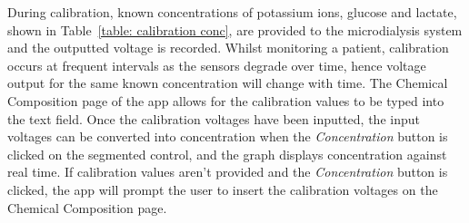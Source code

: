 During calibration, known concentrations of potassium ions, glucose and lactate, shown in Table~\ref{table: calibration conc}, are provided to the microdialysis system and the outputted voltage is recorded. Whilst monitoring a patient, calibration occurs at frequent intervals as the sensors degrade over time, hence voltage output for the same known concentration will change with time. The Chemical Composition page of the app allows for the calibration values to be typed into the text field. Once the calibration voltages have been inputted, the input voltages can be converted into concentration when the \textit{Concentration} button is clicked on the segmented control, and the graph displays concentration against real time. If calibration values aren't provided and the \textit{Concentration} button is clicked, the app will prompt the user to insert the calibration voltages on the Chemical Composition page.








